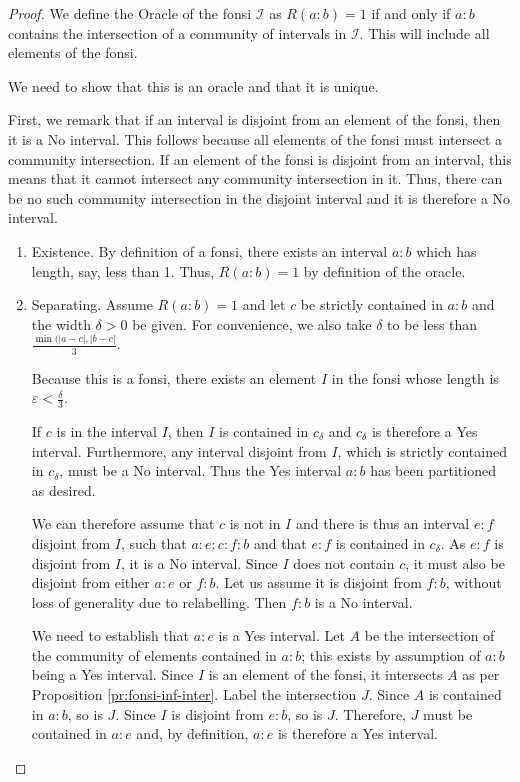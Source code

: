 \documentclass[12pt]{article}
\begin{document}
\begin{proof}
We define the Oracle of the fonsi $\mathcal{I}$ as $R(a :b) = 1$ if and only if $a : b$ contains the intersection of a community of intervals in $\mathcal{I}$. This will include all elements of the fonsi.

We need to show that this is an oracle and that it is unique. 

First, we remark that if an interval is disjoint from an element of the fonsi, then it is a No interval. This follows because all elements of the fonsi must intersect a community intersection. If an element of the fonsi is disjoint from an interval, this means that it cannot intersect any community intersection in it. Thus, there can be no such community intersection in the disjoint interval and it is therefore a No interval.

\begin{enumerate}
    \item Existence. By definition of a fonsi, there exists an interval $a:b$ which has length, say,  less than 1. Thus, $R(a:b)=1$ by definition of the oracle.
    
    \item Separating. Assume $R(a:b)=1$ and let $c$ be strictly contained in $a:b$ and the width $\delta >0$ be given. For convenience, we also take $\delta$ to be less than $\frac{\min(|a-c|, |b-c|}{3}$.

    Because this is a fonsi, there exists an element $I$ in the fonsi whose length is $\varepsilon < \frac{\delta}{3}$. 
    
    If $c$ is in the interval $I$, then $I$ is contained in $c_\delta$ and $c_\delta$ is therefore a Yes interval. Furthermore, any interval disjoint from $I$, which is strictly contained in $c_\delta$, must be a No interval. Thus the Yes interval $a:b$ has been partitioned as desired. 

    We can therefore assume that $c$ is not in $I$ and there is thus an interval $e:f$ disjoint from $I$, such that $a:e:c:f:b$ and that $e:f$ is contained in $c_\delta$. As $e:f$ is disjoint from $I$, it is a No interval. Since $I$ does not contain $c$, it must also be disjoint from either $a:e$ or $f:b$. Let us assume it is disjoint from $f:b$, without loss of generality due to relabelling. Then $f:b$ is a No interval. 

    We need to establish that $a:e$ is a Yes interval. Let $A$ be the intersection of the community of elements contained in $a:b$; this exists by assumption of $a:b$ being a Yes interval. Since $I$ is an element of the fonsi, it intersects $A$ as per Proposition \ref{pr:fonsi-inf-inter}. Label the intersection $J$. Since $A$ is contained in $a:b$, so is $J$. Since $I$ is disjoint from $e:b$, so is $J$. Therefore, $J$ must be contained in $a:e$ and, by definition, $a:e$ is therefore a Yes interval. 
    

\end{enumerate}
\end{proof}
\end{document}

